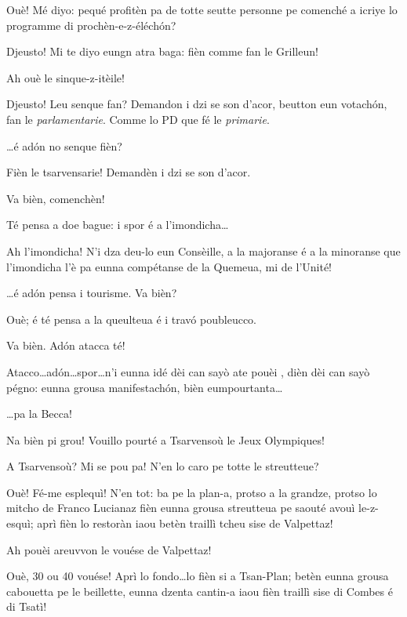 \begin{drama}
\Laurentspeaks Ouè! Mé diyo: pequé profitèn pa de totte seutte personne pe comenché a icriye lo programme di prochèn-e-z-éléchón?

\Ronnyspeaks Djeusto! Mi te diyo eungn atra baga: fièn comme fan le Grilleun!

\Laurentspeaks Ah ouè le sinque-z-itèile!

\Ronnyspeaks Djeusto! Leu senque fan? Demandon i dzi se son d’acor, beutton eun votach\'on, fan le \textit{parlamentarie}. Comme lo PD que fé le \textit{primarie}.

\Laurentspeaks \ldots é ad\'on no senque fièn?

\Ronnyspeaks Fièn le tsarvensarie! Demandèn i dzi se son d’acor.

\Laurentspeaks Va bièn, comenchèn!

\Ronnyspeaks Té pensa a doe bague: i spor é a l'imondicha\ldots

\Laurentspeaks Ah l'imondicha! N'i dza deu-lo eun Consèille, a la majoranse é a la minoranse que l'imondicha l'è pa eunna compétanse de la Quemeua, mi de l'Unité!

\Ronnyspeaks \ldots é ad\'on pensa i tourisme. Va bièn?

\Laurentspeaks Ouè; é té pensa a la queulteua é i travó poubleucco.

\Ronnyspeaks Va bièn. Ad\'on atacca té!

\Laurentspeaks Atacco\ldots ad\'on\ldots spor\ldots n'i eunna idé dèi can sayò ate pouèi , dièn dèi can sayò pégno: eunna grousa manifestach\'on, bièn eumpourtanta\ldots

\Ronnyspeaks \ldots pa la Becca!

\Laurentspeaks Na bièn pi grou! Vouillo pourté a Tsarvensoù le Jeux Olympiques!

\Ronnyspeaks A Tsarvensoù? Mi se pou pa! N'en lo caro pe totte le streutteue?

\Laurentspeaks Ouè! Fé-me esplequì! N'en tot: ba pe la plan-a, protso a la grandze, protso lo mitcho de Franco Lucianaz fièn eunna grousa streutteua pe saouté avouì le-z-esquì; aprì fièn lo restoràn iaou betèn traillì tcheu sise de Valpettaz!

\Ronnyspeaks Ah pouèi areuvvon le vouése de Valpettaz!

\Laurentspeaks Ouè,  30 ou 40 vouése! Aprì lo fondo\ldots lo fièn si a Tsan-Plan; betèn eunna grousa cabouetta pe le beillette, eunna dzenta cantin-a iaou fièn traillì sise di Combes é di Tsatì!


\end{drama}
